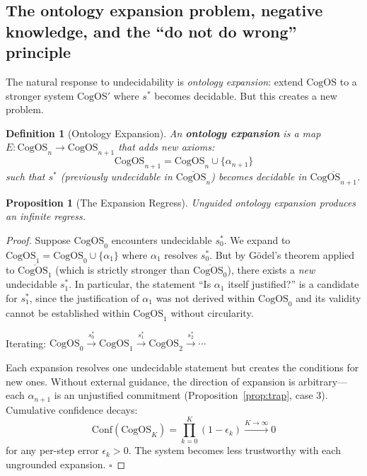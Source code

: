 \documentclass[11pt]{article}
\newtheorem{proposition}{Proposition}
\newtheorem{definition}{Definition}
\newcommand{\CogOS}{\text{CogOS}}
\begin{document}
\subsection{The ontology expansion problem, negative knowledge, and the
``do not do wrong'' principle}

The natural response to undecidability is \textit{ontology expansion}: extend
$\CogOS$ to a stronger system $\CogOS'$ where $s^*$ becomes decidable. But
this creates a new problem.

\begin{definition}[Ontology Expansion]
\label{def:expansion}
An \textbf{ontology expansion} is a map
$E: \CogOS_n \to \CogOS_{n+1}$ that adds new axioms:
\begin{equation}
\CogOS_{n+1} = \CogOS_n \cup \{\alpha_{n+1}\}
\end{equation}
such that $s^*$ (previously undecidable in $\overline{\CogOS_n}$) becomes
decidable in $\overline{\CogOS_{n+1}}$.
\end{definition}

\begin{proposition}[The Expansion Regress]
\label{prop:regress}
Unguided ontology expansion produces an infinite regress.
\end{proposition}

\begin{proof}
Suppose $\CogOS_0$ encounters undecidable $s_0^*$. We expand to
$\CogOS_1 = \CogOS_0 \cup \{\alpha_1\}$ where $\alpha_1$ resolves $s_0^*$.
But by G\"{o}del's theorem applied to $\overline{\CogOS_1}$ (which is
strictly stronger than $\overline{\CogOS_0}$), there exists a \textit{new}
undecidable $s_1^*$. In particular, the statement ``Is $\alpha_1$ itself
justified?'' is a candidate for $s_1^*$, since the justification of
$\alpha_1$ was not derived within $\CogOS_0$ and its validity cannot be
established within $\CogOS_1$ without circularity.

Iterating:
$\CogOS_0 \xrightarrow{s_0^*} \CogOS_1 \xrightarrow{s_1^*}
 \CogOS_2 \xrightarrow{s_2^*} \cdots$

Each expansion resolves one undecidable statement but creates the conditions
for new ones. Without external guidance, the direction of expansion is
arbitrary---each $\alpha_{n+1}$ is an unjustified commitment
(Proposition~\ref{prop:trap}, case 3). Cumulative confidence decays:
\begin{equation}
\text{Conf}(\CogOS_K) = \prod_{k=0}^{K} (1 - \epsilon_k)
\xrightarrow{K \to \infty} 0
\end{equation}
for any per-step error $\epsilon_k > 0$. The system becomes less trustworthy
with each ungrounded expansion. \hfill $\square$
\end{proof}
\end{document}
